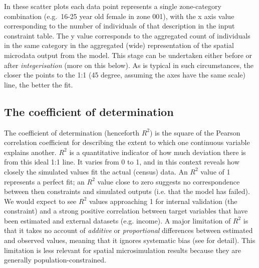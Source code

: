 \documentclass[a4paper,10pt]{article}
\begin{document}
In these scatter plots each data point represents a single zone-category
combination (e.g.~16-25 year old female in zone 001), with the x axis value corresponding
to the number of individuals of that description in the input constraint table.
The y value corresponds to the
aggregated count of individuals in the same category in the aggregated
(wide) representation of the spatial microdata output from the model. %
This stage can be undertaken either before or after \emph{integerisation}
(more on this below).
As is typical in such circumstances,
the closer the points to the
1:1 (45 degree, assuming the axes have the same scale) line, the better the fit.

\subsection{The coefficient of determination}
The coefficient of determination (henceforth $R^2$) is the
square of the Pearson correlation coefficient for describing the
extent to which one continuous variable explains another.
$R^2$ is a quantitative
indicator of how much deviation there is from this ideal
1:1 line. It varies from 0 to 1,
and in this context reveals how closely the
simulated values fit the actual (census) data.
An $R^2$ value of 1 represents a perfect fit; an $R^2$ value
close to zero suggests no correspondence
between then constraints and simulated outputs (i.e. that the model has failed).
We would expect to see $R^2$ values approaching 1 for
internal validation (the constraint) and a strong
positive correlation between target variables that have been estimated and
external datasets (e.g. income). A major limitation of $R^2$ is that
it takes no account of \emph{additive} or \emph{proportional} differences
between estimated and observed values, meaning that it ignores systematic
bias (see \citealp{Legates1999GOF} for detail).
This limitation is less relevant for spatial microsimulation results
because they are generally population-constrained.

\end{document}
